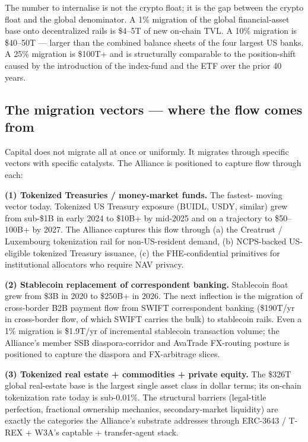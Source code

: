 The number to internalise is not the crypto float; it is the gap
between the crypto float and the global denominator. A 1\% migration of
the global financial-asset base onto decentralized rails is \$4--5T of
new on-chain TVL. A 10\% migration is \$40--50T --- larger than the
combined balance sheets of the four largest US banks. A 25\% migration
is \$100T+ and is structurally comparable to the position-shift caused
by the introduction of the index-fund and the ETF over the prior 40
years.

\subsection{The migration vectors --- where the flow comes from}

Capital does not migrate all at once or uniformly. It migrates through
specific vectors with specific catalysts. The Alliance is positioned to
capture flow through each:

\textbf{(1) Tokenized Treasuries / money-market funds.} The fastest-
moving vector today. Tokenized US Treasury exposure (BUIDL, USDY,
similar) grew from sub-\$1B in early 2024 to \$10B+ by mid-2025 and
on a trajectory to \$50--100B+ by 2027. The Alliance captures this
flow through (a) the Creatrust / Luxembourg tokenization rail for
non-US-resident demand, (b) NCPS-backed US-eligible tokenized
Treasury issuance, (c) the FHE-confidential primitives for
institutional allocators who require NAV privacy.

\textbf{(2) Stablecoin replacement of correspondent banking.}
Stablecoin float grew from \$3B in 2020 to \$250B+ in 2026. The next
inflection is the migration of cross-border B2B payment flow from
SWIFT correspondent banking (\$190T/yr in cross-border flow, of which
SWIFT carries the bulk) to stablecoin rails. Even a 1\% migration is
\$1.9T/yr of incremental stablecoin transaction volume; the
Alliance's member SSB diaspora-corridor and AvaTrade FX-routing
posture is positioned to capture the diaspora and FX-arbitrage
slices.

\textbf{(3) Tokenized real estate + commodities + private equity.}
The \$326T global real-estate base is the largest single asset class
in dollar terms; its on-chain tokenization rate today is sub-0.01\%.
The structural barriers (legal-title perfection, fractional ownership
mechanics, secondary-market liquidity) are exactly the categories the
Alliance's substrate addresses through ERC-3643 / T-REX + W3A's
captable + transfer-agent stack.

